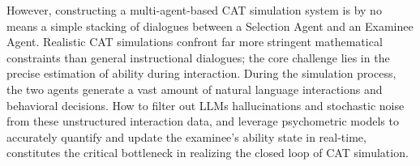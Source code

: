 However, constructing a multi-agent-based CAT simulation system is by no means a simple stacking of dialogues between a Selection Agent and an Examinee Agent\cite{zhu2025multiagentbench}. Realistic CAT simulations confront far more stringent mathematical constraints than general instructional dialogues; the core challenge lies in the precise estimation of ability during interaction. During the simulation process, the two agents generate a vast amount of natural language interactions and behavioral decisions\cite{arana2025foundations}. How to filter out LLMs hallucinations and stochastic noise from these unstructured interaction data, and leverage psychometric models to accurately quantify and update the examinee's ability state in real-time, constitutes the critical bottleneck in realizing the closed loop of CAT simulation.